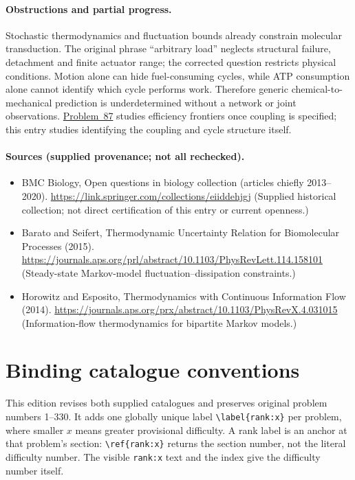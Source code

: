 \documentclass[11pt]{article}
\begin{document}
\paragraph{Obstructions and partial progress.} Stochastic thermodynamics and fluctuation bounds already constrain molecular transduction. The original phrase ``arbitrary load'' neglects structural failure, detachment and finite actuator range; the corrected question restricts physical conditions. Motion alone can hide fuel-consuming cycles, while ATP consumption alone cannot identify which cycle performs work. Therefore generic chemical-to-mechanical prediction is underdetermined without a network or joint observations. \href{https://we-solve.github.io/problems/molecular-motor-efficiency-2c93be40/}{Problem~87} studies efficiency frontiers once coupling is specified; this entry studies identifying the coupling and cycle structure itself.
\paragraph{Sources (supplied provenance; not all rechecked).}
\begin{itemize}
\item BMC Biology, Open questions in biology collection (articles chiefly 2013--2020). \url{https://link.springer.com/collections/eiiddehjgj} (Supplied historical collection; not direct certification of this entry or current openness.)
\item Barato and Seifert, Thermodynamic Uncertainty Relation for Biomolecular Processes (2015). \url{https://journals.aps.org/prl/abstract/10.1103/PhysRevLett.114.158101} (Steady-state Markov-model fluctuation--dissipation constraints.)
\item Horowitz and Esposito, Thermodynamics with Continuous Information Flow (2014). \url{https://journals.aps.org/prx/abstract/10.1103/PhysRevX.4.031015} (Information-flow thermodynamics for bipartite Markov models.)
\end{itemize}


\section*{Binding catalogue conventions}
This edition revises both supplied catalogues and preserves original problem numbers 1--330. It adds one globally unique label \verb|\label{rank:x}| per problem, where smaller $x$ means greater provisional difficulty. A rank label is an anchor at that problem's section: \verb|\ref{rank:x}| returns the section number, not the literal difficulty number. The visible \texttt{rank:x} text and the index give the difficulty number itself.
\end{document}
